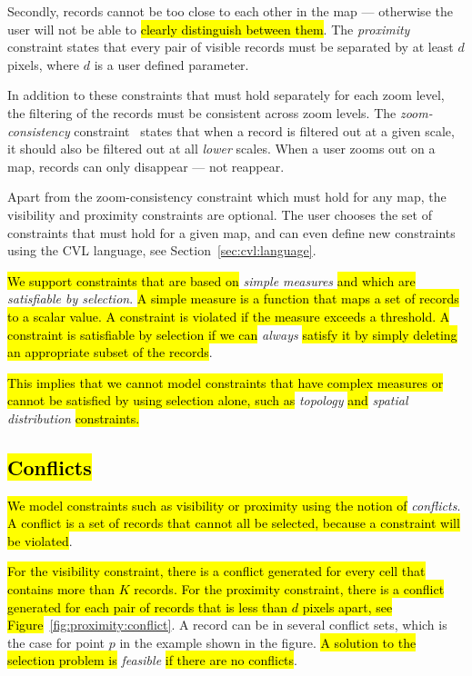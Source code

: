 Secondly, records cannot be too close to each other in the map --- otherwise the user will not be able to \hl{clearly distinguish between them}. The \emph{proximity} constraint states that every pair of visible records must be separated by at least $d$ pixels, where $d$ is a user defined parameter.

In addition to these constraints that must hold separately for each zoom level, the filtering of the records must be consistent across zoom levels. The \emph{zoom-consistency} constraint~\cite{sarma2012fusiontables} states that when a record is filtered out at a given scale, it should also be filtered out at all \emph{lower} scales. When a user zooms out on a map, records can only disappear --- not reappear.

Apart from the zoom-consistency constraint which must hold for any map, the visibility and proximity constraints are optional. The user chooses the set of constraints that must hold for a given map, and can even define new constraints using the CVL language, see Section~\ref{sec:cvl:language}.

\hl{We support constraints that are based on }\emph{simple measures}\hl{ and which are }\emph{satisfiable by selection}.\hl{ A simple measure is a function that maps a set of records to a scalar value. A constraint is violated if the measure exceeds a threshold. A constraint is satisfiable by selection if we can }\emph{always}\hl{ satisfy it by simply deleting an appropriate subset of the records}.

\hl{This implies that we cannot model constraints that have complex measures or cannot be satisfied by using selection alone, such as }\emph{topology}\hl{ and }\emph{spatial distribution}\hl{ constraints.}

\subsection{\hl{Conflicts}}
\label{sec:conflicts}

\hl{We model constraints such as visibility or proximity using the notion of }\emph{conflicts}. \hl{A conflict is a set of records that cannot all be selected, because a constraint will be violated}.

\hl{For the visibility constraint, there is a conflict generated for every cell that contains more than $K$ records. For the proximity constraint, there is a conflict generated for each pair of records that is less than $d$ pixels apart, see Figure}~\ref{fig:proximity:conflict}. A record can be in several conflict sets, which is the case for point $p$ in the example shown in the figure. \hl{A solution to the selection problem is }\emph{feasible}\hl{ if there are no conflicts}.

